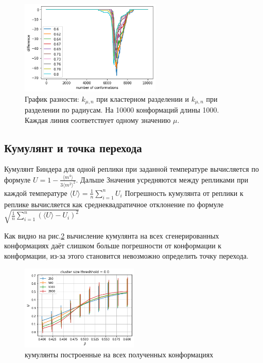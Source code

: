 \begin{figure}[ht]
	\centering
	\includegraphics[width=0.6\textwidth]{../images/radius_and_cluster_comparising_L1000.png}
	\caption{График разности: $k_{\mu, n}$ при кластерном разделении и $k_{\mu, n}$ при разделении по радиусам. На 10000 конформаций длины 1000. Каждая линия соответствует одному значению $\mu$.}
	\label{fig:kmun_dif}
\end{figure}



\subsection{Кумулянт и точка перехода}

Кумулянт Биндера для одной реплики при заданной температуре вычисляется по формуле $U = 1 - \frac{\langle m^4\rangle}{3\langle m^2\rangle ^2}$. Дальше Значения усредняются между репликами при каждой температуре $\langle U\rangle = \frac{1}{n}\sum_{i=1}^{n}U_i$ 
Погрешность кумулянта от реплики к реплике вычисляется как среднеквадратичное отклонение по формуле $\sqrt{\frac{1}{n}\sum_{i=1}^{n}(\langle U\rangle - U_i)^2}$

Как видно на рис.\ref{fig:cumulant_raw} вычисление кумулянта на всех сгенерированных конформациях даёт слишком больше погрешности от конформации к конформации, из-за этого становится невозможно определить точку перехода.

\begin{figure}[ht]
	\centering
	\includegraphics[width=0.5\textwidth]{../images/Cumulant_raw_beta0.4_0.6.png}
	\caption{кумулянты построенные на всех полученных конформациях}
	\label{fig:cumulant_raw}
\end{figure}

